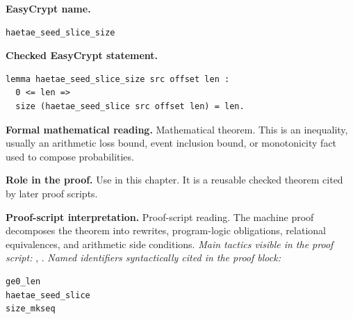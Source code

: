 \begin{formaltheorem}
\noindent\textbf{EasyCrypt name.}
\begin{lstlisting}[language=EasyCrypt,basicstyle=\ttfamily\scriptsize]
haetae_seed_slice_size
\end{lstlisting}
\noindent\textbf{Checked EasyCrypt statement.}
\begin{lstlisting}[language=EasyCrypt,basicstyle=\ttfamily\scriptsize]
lemma haetae_seed_slice_size src offset len :
  0 <= len =>
  size (haetae_seed_slice src offset len) = len.
\end{lstlisting}
\noindent\textbf{Formal mathematical reading.}
Mathematical theorem. This is an inequality, usually an arithmetic loss bound, event inclusion bound, or monotonicity fact used to compose probabilities.

\noindent\textbf{Role in the proof.}
Use in this chapter. It is a reusable checked theorem cited by later proof scripts.

\noindent\textbf{Proof-script interpretation.}
Proof-script reading. The machine proof decomposes the theorem into rewrites, program-logic obligations, relational equivalences, and arithmetic side conditions.
\emph{Main tactics visible in the proof script:} , .
\emph{Named identifiers syntactically cited in the proof block:}
\begin{lstlisting}[language=EasyCrypt,basicstyle=\ttfamily\scriptsize]
ge0_len
haetae_seed_slice
size_mkseq
\end{lstlisting}

\end{formaltheorem}

